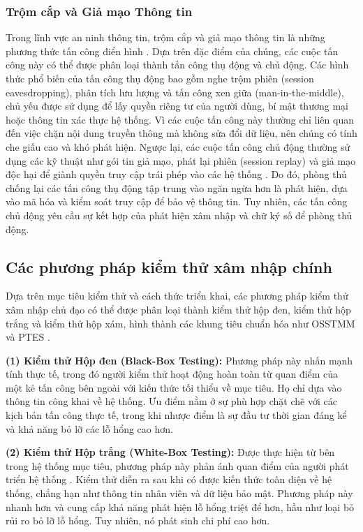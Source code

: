 \documentclass[conference]{IEEEtran}
\begin{document}
\subsubsection{Trộm cắp và Giả mạo Thông tin}
Trong lĩnh vực an ninh thông tin, trộm cắp và giả mạo thông tin là những phương thức tấn công điển hình \cite{ref21}. Dựa trên đặc điểm của chúng, các cuộc tấn công này có thể được phân loại thành tấn công thụ động và chủ động. Các hình thức phổ biến của tấn công thụ động bao gồm nghe trộm phiên (session eavesdropping), phân tích lưu lượng và tấn công xen giữa (man-in-the-middle), chủ yếu được sử dụng để lấy quyền riêng tư của người dùng, bí mật thương mại hoặc thông tin xác thực hệ thống. Vì các cuộc tấn công này thường chỉ liên quan đến việc chặn nội dung truyền thông mà không sửa đổi dữ liệu, nên chúng có tính che giấu cao và khó phát hiện. Ngược lại, các cuộc tấn công chủ động thường sử dụng các kỹ thuật như gói tin giả mạo, phát lại phiên (session replay) và giả mạo độc hại để giành quyền truy cập trái phép vào các hệ thống \cite{ref27}. Do đó, phòng thủ chống lại các tấn công thụ động tập trung vào ngăn ngừa hơn là phát hiện, dựa vào mã hóa và kiểm soát truy cập để bảo vệ thông tin. Tuy nhiên, các tấn công chủ động yêu cầu sự kết hợp của phát hiện xâm nhập và chữ ký số để phòng thủ động.

\subsection{Các phương pháp kiểm thử xâm nhập chính}
Dựa trên mục tiêu kiểm thử và cách thức triển khai, các phương pháp kiểm thử xâm nhập chủ đạo có thể được phân loại thành kiểm thử hộp đen, kiểm thử hộp trắng và kiểm thử hộp xám, hình thành các khung tiêu chuẩn hóa như OSSTMM và PTES \cite{ref1}.

\textbf{(1) Kiểm thử Hộp đen (Black-Box Testing):} Phương pháp này nhấn mạnh tính thực tế, trong đó người kiểm thử hoạt động hoàn toàn từ quan điểm của một kẻ tấn công bên ngoài với kiến thức tối thiểu về mục tiêu. Họ chỉ dựa vào thông tin công khai về hệ thống. Ưu điểm nằm ở sự phù hợp chặt chẽ với các kịch bản tấn công thực tế, trong khi nhược điểm là sự đầu tư thời gian đáng kể và khả năng bỏ lỡ các lỗ hổng cao hơn.

\textbf{(2) Kiểm thử Hộp trắng (White-Box Testing):} Được thực hiện từ bên trong hệ thống mục tiêu, phương pháp này phản ánh quan điểm của người phát triển hệ thống \cite{ref17}. Kiểm thử diễn ra sau khi có được kiến thức toàn diện về hệ thống, chẳng hạn như thông tin nhân viên và dữ liệu bảo mật. Phương pháp này nhanh hơn và cung cấp khả năng phát hiện lỗ hổng triệt để hơn, hầu như loại bỏ rủi ro bỏ lỡ lỗ hổng. Tuy nhiên, nó phát sinh chi phí cao hơn.
\end{document}
